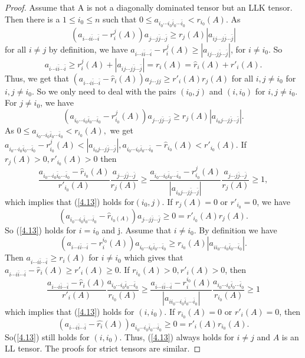 \documentclass[10pt,reqno]{amsart}
\theoremstyle{definition}
\begin{document}
\begin{proof}
Assume that A is not a diagonally dominated tensor but an LLK tensor. Then there is a $1\leq i_{0}\leq n$ such that
$0\leq a_{i_{0}\cdots i_{0}\bar{i}_0\cdots \bar{i}_0}<r_{i_{0}}(A).$
As $$(a_{i\cdots i\bar{i}\cdots\bar{i}}-r_{i}^{j}(A))a_{j\cdots j\bar{j}\cdots\bar{j}}\geq r_{j}(A)|a_{ij\cdots j\bar{j}\cdots \bar{j}}|$$ for all $i\neq j$ by definition, we have
$a_{i\cdots i\bar{i}\cdots\bar{i}}-r_{i}^{j}(A)\geq |a_{ij\cdots j\bar{j}\cdots \bar{j}}|$, for $i\neq i_0$. So $$a_{i\cdots i\bar{i}\cdots\bar{i}}\geq r_{i}^{j}(A)+|a_{ij\cdots j\bar{j}\cdots \bar{j}}|=r_{i}(A)=\hat{r}_{i}(A)+r'_{i}(A).$$ 
Thus, we get that $(a_{i\cdots i\bar{i}\cdots\bar{i}}-\hat{r}_{i}(A))a_{j\cdots jj}\geq r'_{i}(A)r_{j}(A)$ for all $i,j\neq i_{0}$ for $i, j\neq i_0$. So we only need to deal with the pairs $(i_0, j)$ and $(i, i_0)$ for $i, j\neq i_0$.
For $j\neq i_{0}$, we have
$$(a_{i_{0}\cdots i_{0}\bar{i}_0\cdots \bar{i}_0}-r_{i_{0}}^{j}(A))a_{j\cdots j\bar{j}\cdots \bar{j}}\geq r_{j}(A)|a_{i_{0}j\cdots j\bar{j}\cdots \bar{j}}|. $$
As $0\leq a_{i_{0}\cdots i_{0}\bar{i}_0\cdots \bar{i}_0}<r_{i_{0}}(A),$ we get $a_{i_{0}\cdots i_{0}\bar{i}_0\cdots \bar{i}_0}-r_{i_{0}}^{j}(A)<|a_{i_{0}j\cdots j\bar{j}\cdots \bar{j}}|, a_{i_{0}\cdots i_{0}\bar{i}_0\cdots \bar{i}_0}-\hat{r}_{i_{0}}(A)<r'_{i_{0}}(A).$ If $r_{j}(A)>0,r'_{i_{0}}(A)>0$ then
$$\dfrac{a_{i_{0}\cdots i_{0}\bar{i}_0\cdots \bar{i}_0}-\hat{r}_{i_{0}}(A)}{r'_{i_0}(A)}\dfrac{a_{j\cdots j\bar{j}\cdots \bar{j}}}{r_{j}(A)}\geq \dfrac{a_{i_{0}\cdots i_{0}\bar{i}_0\cdots \bar{i}_0}-r_{i_{0}}^{j}(A)}{|a_{i_{0}j\cdots j\bar{j}\cdots \bar{j}}|}\dfrac{a_{j\cdots j\bar{j}\cdots \bar{j}}}{r_{j}(A)}\geq 1,$$
which implies that (\ref{4.13}) holds for$(i_0, j)$. If $r_{j}(A)=0$ or $r'_{i_{0}}=0$, we have
$$(a_{i_{0}\cdots i_{0}\bar{i}_0\cdots \bar{i}_0}-\hat{r}_{i_{0}(A)})a_{j\cdots j\bar{j}\cdots \bar{j}}\geq 0=r'_{i_{0}}(A)r_{j}(A).$$
So (\ref{4.13}) holds for $i=i_{0}$ and j.
Assume that $i\neq i_{0}.$ By definition we have 
$$(a_{i\cdots i\bar{i}\cdots \bar{i}}-r_{i}^{i_0}(A))a_{i_0\cdots i_0\bar{i}_0\cdots\bar{i}_0}\geq r_{i_0}(A)|a_{ii_0\cdots i_0\bar{i}_0\cdots\bar{i}_0}|.$$
Then $a_{i\cdots i\bar{i}\cdots\bar{i}}\geq r_{i}(A)$ for $i\neq i_{0}$ which gives that $a_{i\cdots i\bar{i}\cdots\bar{i}}-\hat{r}_{i}(A)\geq r'_{i}(A)\geq0.$ If $r_{i_0}(A)>0,r'_{i}(A)>0$, then
$$\dfrac{a_{i\cdots i\bar{i}\cdots\bar{i}}-\hat{r}_{i}(A)}{r'_{i}(A)}\dfrac{a_{i_{0}\cdots i_{0}\bar{i}_0\cdots \bar{i}_0}}{r_{i_{0}}(A)}\geq \frac{a_{i\cdots i\bar{i}\cdots \bar{i}}-r_{i}^{i_0}(A)}{|a_{ii_0\cdots i_0\bar{i}_0\cdots\bar{i}_0}|}\frac{a_{i_0\cdots i_0\bar{i}_0\cdots \bar{i}_0}}{r_{i_0}(A)}\geq 1$$
which implies that (\ref{4.13}) holds for $(i, i_{0}).$ If $r_{i_0}(A)=0$ or $r'_i(A)=0$, then 
$$(a_{i\cdots i\bar{i}\cdots\bar{i}}-\hat{r_{i}}(A))a_{i_{0}\cdots i_{0}\bar{i}_0\cdots \bar{i}_0}\geq0=r'_{i}(A)r_{i_{0}}(A).$$
So(\ref{4.13}) still holds for $(i, i_{0})$. 
Thus, (\ref{4.13}) always holds for $i\neq j$ and $A$ is an LL tensor.
The proofs for strict tensors are similar. 
\end{proof}	
\end{document}
